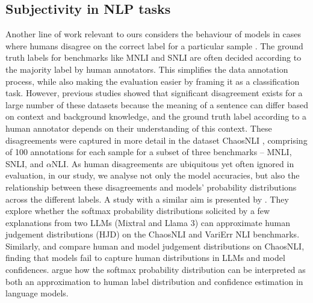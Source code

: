\subsection{Subjectivity in NLP tasks}
\label{related:subjectivity}
Another line of work relevant to ours considers the behaviour of models in cases where humans disagree on the correct label for a particular sample \citep{de-marneffe-etal-2012-happen, plank-etal-2014-learning, Aroyo2015TruthIA, plank-2022-problem}. 
The ground truth labels for benchmarks like MNLI and SNLI are often decided according to the majority label by human annotators. 
This simplifies the data annotation process, while also making the evaluation easier by framing it as a classification task. 
However, previous studies \citep{pavlick-kwiatkowski-2019-inherent, nie-etal-2020-learn} showed that significant disagreement exists for a large number of these datasets because the meaning of a sentence can differ based on context and background knowledge, and the ground truth label according to a human annotator depends on their understanding of this context. 
These disagreements were captured in more detail in the dataset ChaosNLI \citep{nie-etal-2020-learn}, comprising of 100 annotations for each sample for a subset of three benchmarks -- MNLI, SNLI, and $\alpha$NLI.
As human disagreements are ubiquitous yet often ignored in evaluation, in our study, we analyse not only the model accuracies, but also the relationship between these disagreements and models' probability distributions across the different labels.
A study with a similar aim is presented by \citet{chen2024seeingbig}. They explore whether the softmax probability distributions solicited by a few explanations from two LLMs (Mixtral and Llama 3) can approximate human judgement distributions (HJD) on the ChaosNLI and VariErr NLI \citep{weber-genzel-etal-2024-varierr} benchmarks.
Similarly, \citet{baan-etal-2024-interpreting} and \citet{lee-etal-2023-large} compare human and model judgement distributions on ChaosNLI, finding that models fail to capture human distributions in LLMs and model confidences. \citet{baan-etal-2024-interpreting} argue how the softmax probability distribution can be interpreted as both an approximation to human label distribution and confidence estimation in language models.

